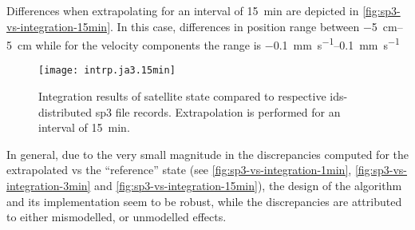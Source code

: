 Differences when extrapolating for an interval of \SI{15}{\minute} are depicted 
in \autoref{fig:sp3-vs-integration-15min}. In this case, differences in position 
range between \qtyrange{-5}{5}{\centi\metre} while for the velocity components 
the range is \qtyrange{-.1}{.1}{\milli\meter\per\second}
\begin{figure}
  \centering
  \texttt{[image: intrp.ja3.15min]}
  \caption{Integration results of satellite state compared to respective 
    \gls{ids}-distributed sp3 file records. Extrapolation is performed for an 
    interval of \SI{15}{\minute}.}
  \label{fig:sp3-vs-integration-15min}
\end{figure}

In general, due to the very small magnitude in the discrepancies computed for the 
extrapolated vs the ``reference'' state (see \autoref{fig:sp3-vs-integration-1min}, 
\autoref{fig:sp3-vs-integration-3min} and \autoref{fig:sp3-vs-integration-15min}), 
the design of the algorithm and its implementation seem to be robust, while the 
discrepancies are attributed to either mismodelled, or unmodelled effects.
